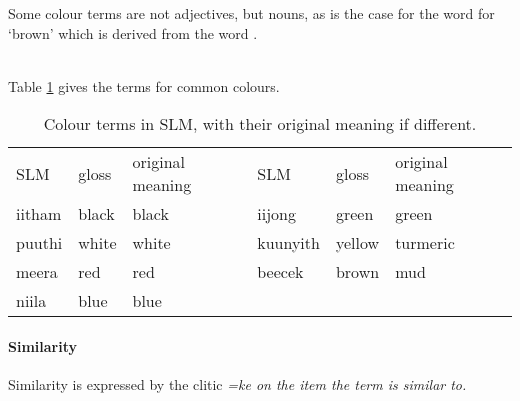 Some colour terms are not adjectives, but nouns, as is the case for the word for `brown' which is derived from the word .

 \\
Table \ref{tab:func:colourterms} gives the terms for common colours.

\begin{table}
\begin{center}
\begin{tabular}{llllll}
SLM & gloss  & original meaning & SLM  & gloss  & original meaning \\
iitham & black & black & iijong & green & green \\
puuthi & white & white & kuunyith & yellow & turmeric\footnotemark \\
meera & red & red & beecek & brown & mud \\
niila & blue & blue &  &  &  \\
\end{tabular}
\end{center}
\caption[Colour terms]{Colour terms in SLM, with their original meaning if different.}
\label{tab:func:colourterms}
\end{table}





\paragraph{Similarity}\label{sec:func:mod:Similarity}
Similarity is expressed by the clitic \em =ke \em on the item the term is similar to.

 \\




